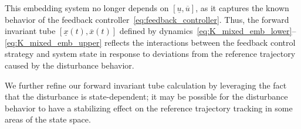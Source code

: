 \documentclass{IEEEojcsys}
\newcommand{\ul}{\underline}
\newcommand{\ol}{\overline}
\begin{document}
This embedding system no longer depends on $[\ul{u}, \ol{u}]$, as it captures the known behavior of the feedback controller~\eqref{eq:feedback_controller}. Thus, the forward invariant tube $[\ul{x}(t), \ol{x}(t)]$ defined by dynamics~\eqref{eq:K_mixed_emb_lower}--\eqref{eq:K_mixed_emb_upper} reflects the interactions between the feedback control strategy and system state in response to deviations from the reference trajectory caused by the disturbance behavior.

We further refine our forward invariant tube calculation by leveraging the fact that the disturbance is state-dependent; it may be possible for the disturbance behavior to have a stabilizing effect on the reference trajectory tracking in some areas of the state space. 
\end{document}

